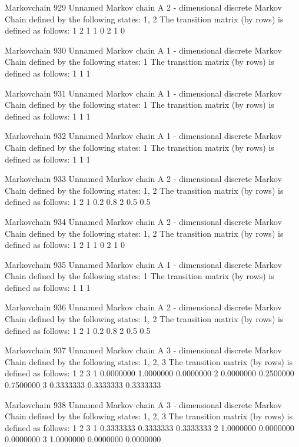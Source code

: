 \documentclass[
  nojss]{jss}
\begin{document}
\begin{CodeChunk}
\begin{CodeOutput}
Markovchain  929 
Unnamed Markov chain 
 A  2 - dimensional discrete Markov Chain defined by the following states: 
 1, 2 
 The transition matrix  (by rows)  is defined as follows: 
  1 2
1 1 0
2 1 0

Markovchain  930 
Unnamed Markov chain 
 A  1 - dimensional discrete Markov Chain defined by the following states: 
 1 
 The transition matrix  (by rows)  is defined as follows: 
  1
1 1

Markovchain  931 
Unnamed Markov chain 
 A  1 - dimensional discrete Markov Chain defined by the following states: 
 1 
 The transition matrix  (by rows)  is defined as follows: 
  1
1 1

Markovchain  932 
Unnamed Markov chain 
 A  1 - dimensional discrete Markov Chain defined by the following states: 
 1 
 The transition matrix  (by rows)  is defined as follows: 
  1
1 1

Markovchain  933 
Unnamed Markov chain 
 A  2 - dimensional discrete Markov Chain defined by the following states: 
 1, 2 
 The transition matrix  (by rows)  is defined as follows: 
    1   2
1 0.2 0.8
2 0.5 0.5

Markovchain  934 
Unnamed Markov chain 
 A  2 - dimensional discrete Markov Chain defined by the following states: 
 1, 2 
 The transition matrix  (by rows)  is defined as follows: 
  1 2
1 1 0
2 1 0

Markovchain  935 
Unnamed Markov chain 
 A  1 - dimensional discrete Markov Chain defined by the following states: 
 1 
 The transition matrix  (by rows)  is defined as follows: 
  1
1 1

Markovchain  936 
Unnamed Markov chain 
 A  2 - dimensional discrete Markov Chain defined by the following states: 
 1, 2 
 The transition matrix  (by rows)  is defined as follows: 
    1   2
1 0.2 0.8
2 0.5 0.5

Markovchain  937 
Unnamed Markov chain 
 A  3 - dimensional discrete Markov Chain defined by the following states: 
 1, 2, 3 
 The transition matrix  (by rows)  is defined as follows: 
          1         2         3
1 0.0000000 1.0000000 0.0000000
2 0.0000000 0.2500000 0.7500000
3 0.3333333 0.3333333 0.3333333

Markovchain  938 
Unnamed Markov chain 
 A  3 - dimensional discrete Markov Chain defined by the following states: 
 1, 2, 3 
 The transition matrix  (by rows)  is defined as follows: 
          1         2         3
1 0.3333333 0.3333333 0.3333333
2 1.0000000 0.0000000 0.0000000
3 1.0000000 0.0000000 0.0000000


\end{CodeOutput}
\end{CodeChunk}
\end{document}
